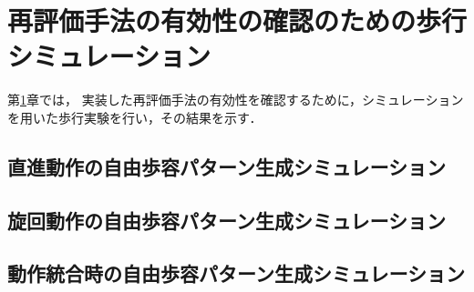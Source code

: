 ﻿

\chapter{再評価手法の有効性の確認のための歩行シミュレーション}\label{chapter:再評価手法の有効性の確認のための歩行シミュレーション}
第\ref{chapter:再評価手法の有効性の確認のための歩行シミュレーション}章では，
実装した再評価手法の有効性を確認するために，シミュレーションを用いた歩行実験を行い，その結果を示す．

\section{直進動作の自由歩容パターン生成シミュレーション}


\section{旋回動作の自由歩容パターン生成シミュレーション}


\section{動作統合時の自由歩容パターン生成シミュレーション}


